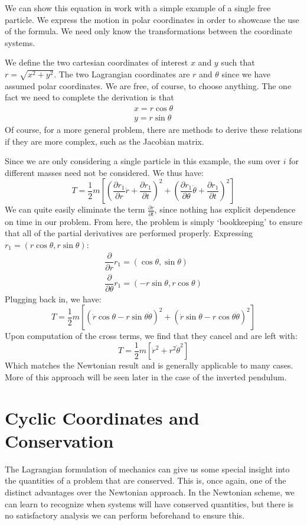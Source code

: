 \begin{example}
We can show this equation in work with a simple example of a single free particle. We express the motion in polar coordinates in order to showcase the use of the formula. We need only know the transformations between the coordinate systems.

We define the two cartesian coordinates of interest $x$ and $y$ such that $r=\sqrt{x^2+y^2}$. The two \gls{Lagrangian} coordinates are $r$ and $\theta$ since we have assumed polar coordinates. We are free, of course, to choose anything. The one fact we need to complete the derivation is that 
\begin{gather}
    x=r\cos\theta\\
    y=r\sin\theta
\end{gather}
Of course, for a more general problem, there are methods to derive these relations if they are more complex, such as the Jacobian matrix.

Since we are only considering a single particle in this example, the sum over $i$ for different masses need not be considered. We thus have:
$$T=\frac{1}{2}m\left[\left(\frac{\partial r_1}{\partial r}\dot{r}+\frac{\partial r_1}{\partial t}\right)^2+\left(\frac{\partial r_1}{\partial \theta}\dot{\theta}+\frac{\partial r_1}{\partial t}\right)^2\right]$$
We can quite easily eliminate the term $\frac{\partial r}{\partial t}$, since nothing has explicit dependence on time in our problem. From here, the problem is simply `bookkeeping' to ensure that all of the partial derivatives are performed properly. Expressing $r_1 = (r\cos\theta,r\sin\theta)$:
$$\begin{array}{l}
\dfrac{\partial}{\partial r}r_1=(\cos\theta,\sin\theta)\\
    \dfrac{\partial}{\partial \theta}r_1=(-r\sin\theta,r\cos\theta)
\end{array}$$
Plugging back in, we have:
$$T=\frac{1}{2}m\left[\left(\dot{r}\cos\theta-r\sin\theta\dot{\theta}\right)^2+\left(\dot{r}\sin\theta-r\cos\theta\dot{\theta}\right)^2\right]$$
Upon computation of the cross terms, we find that they cancel and are left with:
$$T=\frac{1}{2}m\left[\dot{r}^2+r^2\dot{\theta}^2\right]$$
Which matches the Newtonian result and is generally applicable to many cases. More of this approach will be seen later in the case of the inverted pendulum.
\end{example}

\section{Cyclic Coordinates and Conservation}
The \gls{Lagrangian} formulation of mechanics can give us some special insight into the quantities of a problem that are conserved. This is, once again, one of the distinct advantages over the Newtonian approach. In the Newtonian scheme, we can learn to recognize when systems will have conserved quantities, but there is no satisfactory analysis we can perform beforehand to ensure this. 

